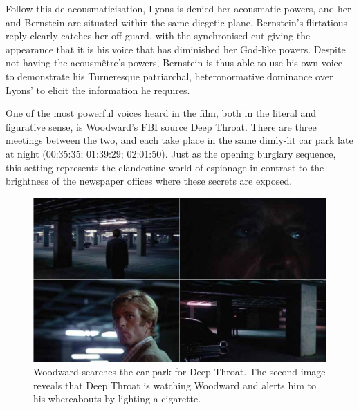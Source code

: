 Follow this de-acousmaticisation, Lyons is denied her acousmatic powers, and her and Bernstein are situated within the same diegetic plane.
Bernstein's flirtatious reply clearly catches her off-guard, with the synchronised cut giving the appearance that it is his voice that has diminished her God-like powers.
Despite not having the acousmêtre's powers, Bernstein is thus able to use his own voice to demonstrate his Turneresque patriarchal, heteronormative dominance over Lyons' to elicit the information he requires.

One of the most powerful voices heard in the film, both in the literal and figurative sense, is Woodward's FBI source Deep Throat.
There are three meetings between the two, and each take place in the same dimly-lit car park late at night (00:35:35; 01:39:29; 02:01:50).
Just as the opening burglary sequence, this setting represents the clandestine world of espionage in contrast to the brightness of the newspaper offices where these secrets are exposed.
\begin{figure}
    \centering
    \includegraphics[width=1\linewidth]{img/president-deep-reveal.pdf}
    \caption{Woodward searches the car park for Deep Throat. The second image reveals that Deep Throat is watching Woodward and alerts him to his whereabouts by lighting a cigarette.}
    \label{fig:president-deep-reveal}
\end{figure}

